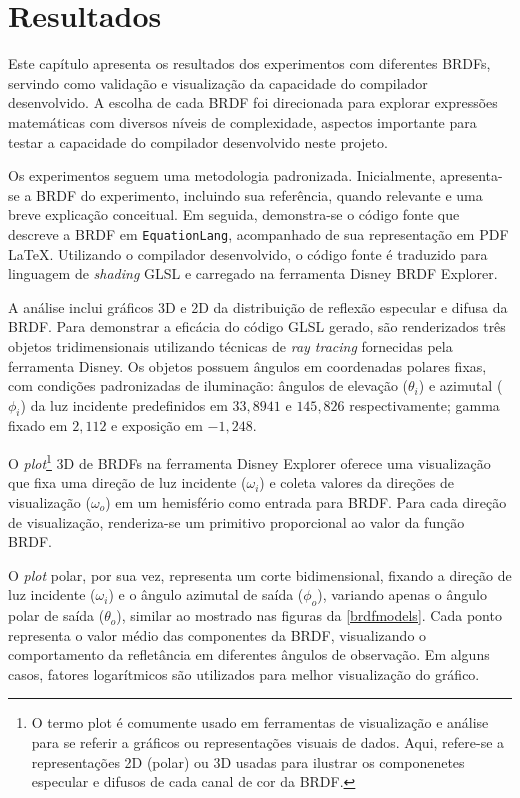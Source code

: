 \chapter{Resultados}
\label{chapter.resultados}


Este capítulo apresenta os resultados dos experimentos com diferentes BRDFs, servindo como validação e visualização da capacidade do compilador desenvolvido. A escolha de cada BRDF foi direcionada para explorar expressões matemáticas com diversos níveis de complexidade, aspectos importante para testar a capacidade do compilador desenvolvido neste projeto.

Os experimentos seguem uma metodologia padronizada. Inicialmente, apresenta-se a BRDF do experimento, incluindo sua referência, quando relevante e uma breve explicação conceitual. Em seguida, demonstra-se o código fonte que descreve a BRDF em \texttt{EquationLang}, acompanhado de sua representação em PDF \LaTeX{}. Utilizando o compilador desenvolvido, o código fonte é traduzido para linguagem de \textit{shading} GLSL e carregado na ferramenta Disney BRDF Explorer.

A análise inclui gráficos 3D e 2D da distribuição de reflexão especular e difusa da BRDF. Para demonstrar a eficácia do código GLSL gerado, são renderizados três objetos tridimensionais utilizando técnicas de \textit{ray tracing} fornecidas pela ferramenta Disney. Os objetos possuem ângulos em coordenadas polares fixas, com condições padronizadas de iluminação: ângulos de elevação ($\theta_i$) e azimutal ($\phi_i$) da luz incidente predefinidos em $33,8941$ e $145,826$ respectivamente; gamma fixado em $2,112$ e exposição em $-1,248$.

O \textit{plot}\footnote{O termo plot é comumente usado em ferramentas de visualização e análise para se referir a gráficos ou representações visuais de dados. Aqui, refere-se a representações 2D (polar) ou 3D usadas para ilustrar os componenetes especular e difusos de cada canal de cor da BRDF.} 3D de BRDFs na ferramenta Disney Explorer oferece uma visualização que fixa uma direção de luz incidente ($\omega_i$) e coleta valores da direções de visualização ($\omega_o$) em um hemisfério como entrada para BRDF. Para cada direção de visualização, renderiza-se um primitivo proporcional ao valor da função BRDF.

O \textit{plot} polar, por sua vez, representa um corte bidimensional, fixando a direção de luz incidente ($\omega_i$) e o ângulo azimutal de saída ($\phi_o$), variando apenas o ângulo polar de saída ($\theta_o$), similar ao mostrado nas figuras da \autoref{brdfmodels}. Cada ponto representa o valor médio das componentes da BRDF, visualizando o comportamento da refletância em diferentes ângulos de observação. Em alguns casos, fatores logarítmicos são utilizados para melhor visualização do gráfico.

